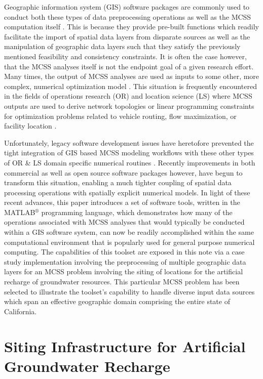 Geographic information system (GIS) software packages are commonly used to conduct both these types of data preprocessing operations as well as the MCSS computation itself \cite{Malczewski2004, Malczewski2006}. This is because they provide pre-built functions which readily facilitate the import of spatial data layers from disparate sources as well as the manipulation of geographic data layers such that they satisfy the previously mentioned feasibility and consistency constraints. It is often the case however, that the MCSS analyses itself is not the endpoint goal of a given research effort. Many times, the output of MCSS analyses are used as inputs to some other, more complex, numerical optimization model \cite{Church2002}. This situation is frequently encountered in the fields of operations research (OR) and location science (LS) where MCSS outputs are used to derive network topologies or linear programming constraints for optimization problems related to vehicle routing, flow maximization, or facility location \cite{Huber1985, Church1992}. 

Unfortunately, legacy software development issues have heretofore prevented the tight integration of GIS based MCSS modeling workflows with these other types of OR \& LS domain specific numerical routines \cite{Church2002}. Recently improvements in both commercial as well as open source software packages however, have begun to transform this situation, enabling a much tighter coupling of spatial data processing operations with spatially explicit numerical models. In light of these recent advances, this paper introduces a set of software tools, written in the MATLAB$^{\circledR}$ programming language, which demonstrates how many of the operations associated with MCSS analyses that would typically be conducted within a GIS software system, can now be readily accomplished within the same computational environment that is popularly used for general purpose numerical computing. The capabilities of this toolset are exposed in this note via a case study implementation involving the preprocessing of multiple geographic data layers for an MCSS problem involving the siting of locations for the artificial recharge of groundwater resources. This particular MCSS problem has been selected to illustrate the toolset's capability to handle diverse input data sources which span an effective geographic domain comprising the entire state of California.

\section{Siting Infrastructure for Artificial Groundwater Recharge}
    
